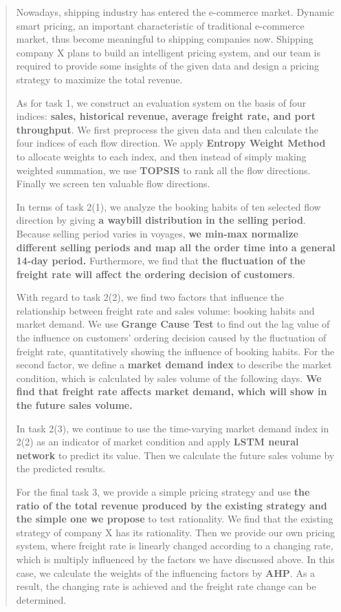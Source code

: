 \begin{abstract}

Nowadays, shipping industry has entered the e-commerce market. Dynamic smart pricing, an important characteristic of traditional e-commerce market, thus become meaningful to shipping companies now. Shipping company X plans to build an intelligent pricing system, and our team is required to provide some insights of the given data and design a pricing strategy to maximize the total revenue. 

As for task 1, we construct an evaluation system on the basis of four indices: \textbf{sales, historical revenue, average freight rate, and port throughput}. We first preprocess the given data and then calculate the four indices of each flow direction. We apply \textbf{Entropy Weight Method} to allocate weights to each index, and then instead of simply making weighted summation, we use \textbf{TOPSIS} to rank all the flow directions. Finally we screen ten valuable flow directions.

In terms of task 2(1), we analyze the booking habits of ten selected flow direction by giving \textbf{a waybill distribution in the selling period}. Because selling period varies in voyages, \textbf{we min-max normalize different selling periods and map all the order time into a general 14-day period.} Furthermore, we find that \textbf{the fluctuation of the freight rate will affect the ordering decision of customers}.

With regard to task 2(2), we find two factors that influence the relationship between freight rate and sales volume: booking habits and market demand. We use \textbf{Grange Cause Test} to find out the lag value of the influence on customers' ordering decision caused by the fluctuation of freight rate, quantitatively showing the influence of booking habits. For the second factor, we define a \textbf{market demand index} to describe the market condition, which is calculated by sales volume of the following days. \textbf{We find that freight rate affects market demand, which will show in the future sales volume.}

In task 2(3), we continue to use the time-varying market demand index in 2(2) as an indicator of market condition and apply \textbf{LSTM neural network} to predict its value. Then we calculate the future sales volume by the predicted results.

For the final task 3, we provide a simple pricing strategy and use \textbf{the ratio of the total revenue produced by the existing strategy and the simple one we propose} to test rationality. We find that the existing strategy of company X has its rationality. Then we provide our own pricing system, where freight rate is linearly changed according to a changing rate, which is multiply influenced by the factors we have discussed above. In this case, we calculate the weights of the influencing factors by \textbf{AHP}. As a result, the changing rate is achieved and the freight rate change can be determined.


\end{abstract}
